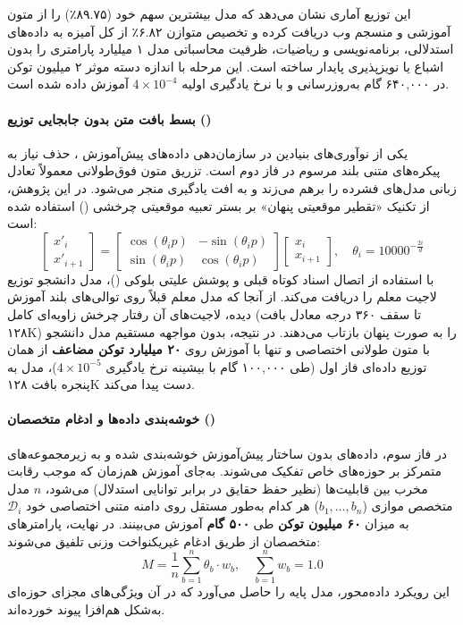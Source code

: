 این توزیع آماری نشان می‌دهد که مدل بیشترین سهم خود (۸۹.۷۵٪) را از متون آموزشی و منسجم وب دریافت کرده و تخصیص متوازن ۶.۸۲٪ از کل آمیزه به داده‌های استدلالی، برنامه‌نویسی و ریاضیات، ظرفیت محاسباتی مدل ۱ میلیارد پارامتری را بدون اشباع یا نویزپذیری پایدار ساخته است. این مرحله با اندازه دسته موثر ۲ میلیون توکن در ۶۴۰,۰۰۰ گام به‌روزرسانی و با نرخ یادگیری اولیه $4 \times 10^{-4}$ آموزش داده شده است.

\paragraph*{بسط بافت متن بدون جابجایی توزیع ()}
یکی از نوآوری‌های بنیادین در سازمان‌دهی داده‌های پیش‌آموزش ، حذف نیاز به پیکره‌های متنی بلند مرسوم در فاز دوم است. تزریق متون فوق‌طولانی معمولاً تعادل زبانی مدل‌های فشرده را برهم می‌زند و به افت یادگیری منجر می‌شود. در این پژوهش، از تکنیک «تقطیر موقعیتی پنهان» بر بستر تعبیه موقعیتی چرخشی () استفاده شده است:
\begin{equation}
    \begin{bmatrix} x'_i \\ x'_{i+1} \end{bmatrix} = \begin{bmatrix} \cos(\theta_i p) & -\sin(\theta_i p) \\ \sin(\theta_i p) & \cos(\theta_i p) \end{bmatrix} \begin{bmatrix} x_i \\ x_{i+1} \end{bmatrix}, \quad \theta_i = 10000^{-\frac{2i}{d}}
\end{equation}
با استفاده از اتصال اسناد کوتاه قبلی و پوشش علیتی بلوکی ()، مدل دانشجو توزیع لاجیت معلم را دریافت می‌کند. از آنجا که مدل معلم قبلاً روی توالی‌های بلند آموزش دیده، لاجیت‌های آن رفتار چرخش زاویه‌ای کامل (تا سقف ۳۶۰ درجه معادل بافت ۱۲۸K) را به صورت پنهان بازتاب می‌دهند. در نتیجه، بدون مواجهه مستقیم مدل دانشجو با متون طولانی اختصاصی و تنها با آموزش روی \textbf{۲۰ میلیارد توکن مضاعف} از همان توزیع داده‌ای فاز اول (طی ۱۰۰,۰۰۰ گام با بیشینه نرخ یادگیری $4 \times 10^{-5}$)، مدل به پنجره بافت ۱۲۸K دست پیدا می‌کند.

\paragraph*{خوشه‌بندی داده‌ها و ادغام متخصصان ()}
در فاز سوم، داده‌های بدون ساختار پیش‌آموزش خوشه‌بندی شده و به زیرمجموعه‌های متمرکز بر حوزه‌های خاص تفکیک می‌شوند. به‌جای آموزش هم‌زمان که موجب رقابت مخرب بین قابلیت‌ها (نظیر حفظ حقایق در برابر توانایی استدلال) می‌شود، $n$ مدل متخصص موازی ($b_1, \dots, b_n$) هر کدام به‌طور مستقل روی دامنه متنی اختصاصی خود $\mathcal{D}_i$ به میزان \textbf{۶۰ میلیون توکن} طی \textbf{۵۰۰ گام} آموزش می‌بینند. در نهایت، پارامترهای متخصصان از طریق ادغام غیریکنواخت وزنی تلفیق می‌شوند:
\begin{equation}
    M = \frac{1}{n} \sum_{b=1}^{n} \theta_b \cdot w_b, \quad \sum_{b=1}^{n} w_b = 1.0
\end{equation}
این رویکرد داده‌محور، مدل پایه  را حاصل می‌آورد که در آن ویژگی‌های مجزای حوزه‌ای به‌شکل هم‌افزا پیوند خورده‌اند.

